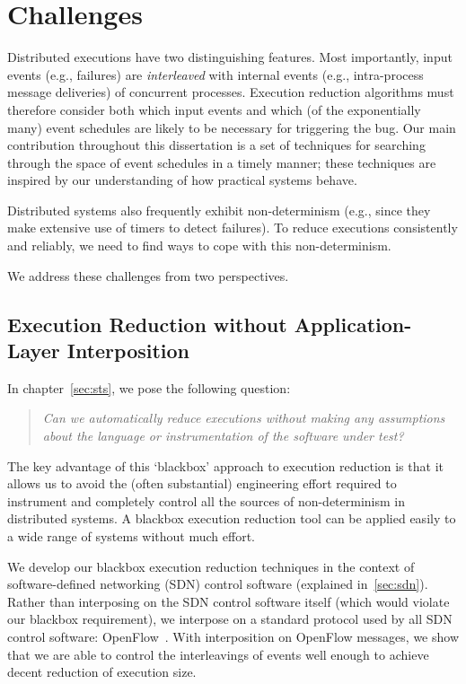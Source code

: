 
\section{Challenges}

Distributed executions have two distinguishing features. Most importantly, input events
(e.g., failures)
are {\em interleaved} with internal events (e.g., intra-process
message deliveries) of concurrent processes. Execution reduction algorithms must therefore consider both which
input events and which (of the exponentially many)
event schedules are likely to be necessary for triggering the bug. Our main contribution
throughout this dissertation is a set of techniques for searching
through the space of event schedules in a timely manner; these techniques are inspired
by our understanding of how practical systems behave.

Distributed systems also frequently exhibit non-determinism (e.g., since they
make extensive use of timers to detect failures). To reduce executions
consistently and reliably, we need to find ways to cope with this non-determinism.

We address these challenges from two perspectives.

\subsection{Execution Reduction without Application-Layer Interposition}

In chapter~\ref{sec:sts}, we pose
the following question:

\begin{quote}
\textit{Can we automatically reduce
executions without making any assumptions about the language or
instrumentation of the software under test?}
\end{quote}

The key advantage of this `blackbox' approach to execution reduction is that
it allows us to avoid the (often substantial) engineering effort required to
instrument and completely control all the sources of non-determinism in
distributed
systems. A blackbox execution reduction tool can be applied easily to a wide
range of systems without much effort.

We develop our blackbox execution reduction techniques
in the context of software-defined
networking (SDN) control software (explained in~\ref{sec:sdn}). Rather than interposing on the SDN control
software itself
(which would violate our blackbox requirement), we interpose on a standard
protocol used by all SDN control software: OpenFlow~\cite{openflow}. With
interposition on OpenFlow messages, we show that we are able to control the
interleavings of events well enough to achieve decent reduction of execution
size.

